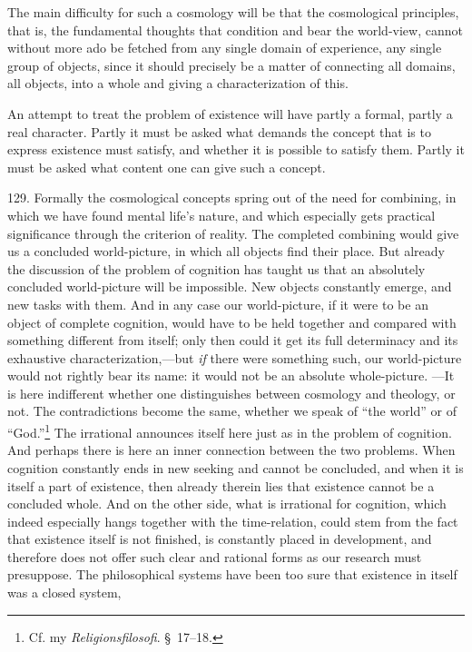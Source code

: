 \documentclass[12pt,a4paper]{book}
\newcommand{\opage}[1]{\marginnote{\footnotesize\textit{[#1]}}}
\begin{document}
The main difficulty for such a cosmology will be that the cosmological principles, that is,
the fundamental thoughts that condition and bear the world-view, cannot without more ado be
fetched from any single domain of experience, any single group of objects, since it should
precisely be a matter of connecting all domains, all objects, into a whole and giving a
characterization of this.

An attempt to treat the problem of existence will have partly a formal, partly a real
character. Partly it must be asked what demands the concept that is to express existence
must satisfy, and whether it is possible to satisfy them. Partly it must be asked what
content one can give such a concept.

129. Formally the cosmological concepts spring out of the need for combining, in which we
have found mental life's nature, and which especially gets practical significance through
the criterion of reality. The completed combining would give us a concluded world-picture,
in which all objects find their place. But already the discussion of the problem of
cognition has taught us that an absolutely concluded world-picture will be impossible. New
objects constantly emerge, and new tasks with them. And in any case our world-picture,
if it were to be an object of complete cognition, would have to be held together and
compared with something different from itself; only then could it get its full determinacy
and its exhaustive characterization,---but \emph{if} there were something such, our
world-picture would not rightly bear its name: it would not be an absolute whole-picture.
---It is here indifferent whether one distinguishes between cosmology and theology, or not.
The contradictions become the same, whether we speak of ``the world'' or of
``God.''\footnote{Cf. my \emph{Religionsfilosofi}. \S\ 17--18.} The irrational announces
itself here just as in the problem of cognition. And perhaps there is here an inner
connection between the two problems. When cognition constantly ends in new seeking and
\opage{310}cannot be concluded, and when it is itself a part of existence, then already therein lies
that existence cannot be a concluded whole. And on the other side, what is irrational for
cognition, which indeed especially hangs together with the time-relation, could stem from
the fact that existence itself is not finished, is constantly placed in development, and
therefore does not offer such clear and rational forms as our research must presuppose.
The philosophical systems have been too sure that existence in itself was a closed system,
\end{document}
